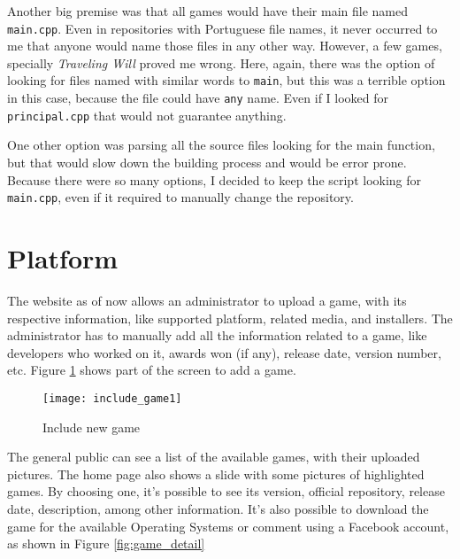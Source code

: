 Another big premise was that all games would have their main file named \texttt{main.cpp}. Even in repositories with Portuguese file names, it never occurred to me that anyone would name those files in any other way. However, a few games, specially \textit{Traveling Will} proved me wrong. Here, again, there was the option of looking for files named with similar words to \texttt{main}, but this was a terrible option in this case, because the file could have \texttt{any} name. Even if I looked for \texttt{principal.cpp} that would not guarantee anything.

One other option was parsing all the source files looking for the main function, but that would slow down the building process and would be error prone. Because there were so many options, I decided to keep the script looking for \texttt{main.cpp}, even if it required to manually change the repository.


\section{Platform}
\label{sec:platform}

The website as of now allows an administrator to upload a game, with its respective information, like supported platform, related media, and installers.
The administrator has to manually add all the information related to a game, like developers who worked on it, awards won (if any), release date, version number, etc. Figure \ref{fig:include_game1} shows part of the screen to add a game.



\begin{figure}[h!]
\centering
\texttt{[image: include\_game1]}
\caption{Include new game}
\label{fig:include_game1}
\end{figure}

The general public can see a list of the available games, with their uploaded pictures. The home page also shows a slide with some pictures of highlighted games. By choosing one, it's possible to see its version, official repository, release date, description, among other information. It's also possible to download the game for the available Operating Systems or comment using a Facebook account, as shown in Figure \ref{fig:game_detail}

